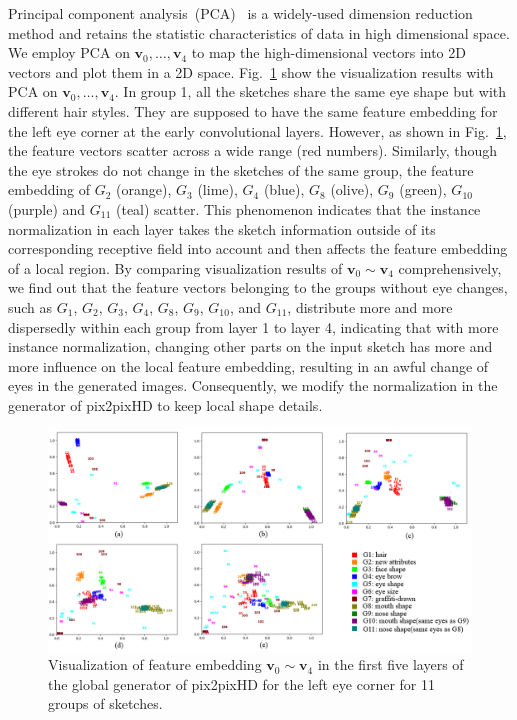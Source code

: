 \documentclass{article}
\begin{document}
Principal component analysis~(PCA)~\cite{pca} is a widely-used dimension reduction method and retains the statistic characteristics of data in high dimensional space. 
We employ PCA on $\boldsymbol{v}_0,\ldots, \boldsymbol{v}_4$ to map the high-dimensional vectors into 2D vectors and plot them in a 2D space. 
Fig.~\ref{fig:pca_0} show the visualization results with PCA on $\boldsymbol{v}_0,\ldots,\boldsymbol{v}_4$. 
%
In group 1, all the sketches share the same eye shape but with different hair styles. They are supposed to have the same feature embedding for the left eye corner at the early convolutional layers. However, as shown in Fig.~\ref{fig:pca_0}, the feature vectors scatter across a wide range (red numbers). 
Similarly, though the eye strokes do not change in the sketches of the same group, the feature embedding of $G_2$ (orange), $G_3$ (lime), $G_4$ (blue), $G_8$ (olive), $G_9$ (green), $G_{10}$ (purple) and $G_{11}$ (teal) scatter.
This phenomenon indicates that the instance normalization in each layer takes the sketch information outside of its corresponding receptive field into account and then affects the feature embedding of a local region. 
By comparing visualization results of $\boldsymbol{v}_0\sim\boldsymbol{v}_4$ comprehensively, we find out that the feature vectors belonging to the groups without eye changes, such as $G_1$, $G_2$, $G_3$, $G_4$, $G_8$, $G_9$, $G_{10}$, and $G_{11}$, distribute more and more dispersedly within each group from layer 1 to layer 4, indicating that with more instance normalization, changing other parts on the input sketch has more and more influence on the local feature embedding, resulting in an awful change of eyes in the generated images.
Consequently, we modify the normalization in the generator of pix2pixHD to keep local shape details. 

\begin{figure}[htb]
	\centering
	\includegraphics[width=0.9 \textwidth]{pca_0.png}
	\caption{Visualization of feature embedding $\boldsymbol{v}_0\sim\boldsymbol{v}_4$ in the first five layers of the global generator of pix2pixHD for the left eye corner for 11 groups of sketches.  }
	\label{fig:pca_0}
\end{figure}      
\end{document}
